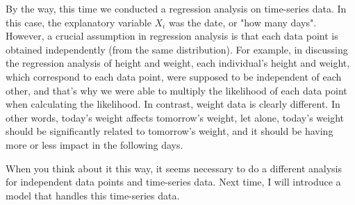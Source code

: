 \documentclass{ltjsbook}
\begin{document}
By the way, this time we conducted a regression analysis on time-series data. In this case, the explanatory variable $X_i$ was the date, or "how many days". However, a crucial assumption in regression analysis is that each data point is obtained independently (from the same distribution). For example, in discussing the regression analysis of height and weight, each individual's height and weight, which correspond to each data point, were supposed to be independent of each other, and that's why we were able to multiply the likelihood of each data point when calculating the likelihood. In contrast, weight data is clearly different. In other words, today's weight affects tomorrow's weight, let alone, today's weight should be significantly related to tomorrow's weight, and it should be having more or less impact in the following days.

When you think about it this way, it seems necessary to do a different analysis for independent data points and time-series data. Next time, I will introduce a model that handles this time-series data.

\end{document}
